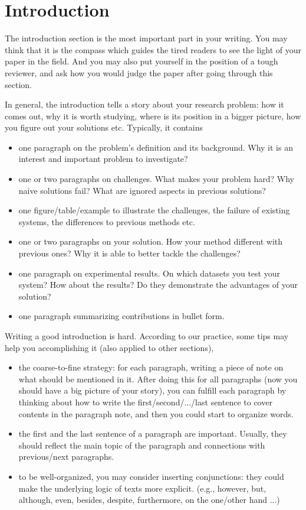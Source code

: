 \section{Introduction}

The introduction section is the most important part in your writing.
You may think that it is the compass which guides the tired readers to 
see the light of your paper in the field.
And you may also put yourself in the position of a tough reviewer,
and ask how you would judge the paper after going through this section.

In general, the introduction tells a story about your research problem: 
how it comes out, why it is worth studying, 
where is its position in a bigger picture,
how you figure out your solutions etc.
Typically, it contains
\begin{itemize}
    \item one paragraph on the problem's definition and its background. 
     Why it is an interest and important problem to investigate?
    \item one or two paragraphs on challenges. 
     What makes your problem hard?
     Why naive solutions fail? 
     What are ignored aspects in previous solutions?
    \item one figure/table/example to illustrate the challenges, 
    the failure of existing systems,
    the differences to previous methods etc.
    \item one or two paragraphs on your solution. 
     How your method different with previous ones?
     Why it is able to better tackle the challenges?
    \item one paragraph on experimental results. 
     On which datasets you test your system?
     How about the results? 
     Do they demonstrate the advantages of your solution?
    \item one paragraph summarizing contributions in bullet form.
\end{itemize}


Writing a good introduction is hard. 
According to our practice, some tips may help you accomplishing it
(also applied to other sections),
\begin{itemize}
    \item the coarse-to-fine strategy: 
    for each paragraph, writing a piece of note on what should be mentioned in it. 
    After doing this for all paragraphs 
    (now you should have a big picture of your story), 
    you can fulfill each paragraph by thinking about how to write 
    the first/second/.../last sentence to cover contents in the paragraph note,
    and then you could start to organize words.
    \item the first and the last sentence of a paragraph are important.
    Usually, they should reflect the main topic of the paragraph and connections
    with previous/next paragraphs.
    \item to be well-organized, you may consider inserting conjunctions:
    they could make the underlying logic of texts more explicit.
    (e.g., however, but, although, even, besides, despite, furthermore,
    on the one/other hand ...)
\end{itemize}


